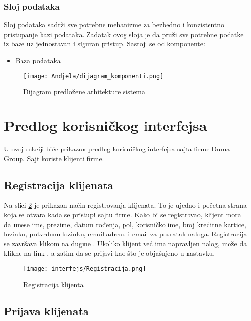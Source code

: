 \documentclass[a4paper]{article}
\begin{document}
\subsubsection{Sloj podataka}
Sloj podataka sadrži sve potrebne mehanizme za bezbedno i konzistentno pristupanje bazi podataka. Zadatak ovog sloja je da pruži sve potrebne podatke iz baze uz jednostavan i siguran  pristup.\newline
Sastoji se od komponente:
\begin{itemize}
    \item Baza podataka
\end{itemize}

\begin{figure}[H]
    \centering
    \texttt{[image: Andjela/dijagram\_komponenti.png]}
    \caption{Dijagram predložene arhitekture sistema}
    \label{fig:dijagramTabela}
\end{figure}

\section{Predlog korisničkog interfejsa}

U ovoj sekciji biće prikazan predlog korisničkog interfejsa sajta firme Duma Group. Sajt koriste klijenti firme.

\subsection{Registracija klijenata}

Na slici \ref{fig:ki_reg} je prikazan način registrovanja klijenata. To je ujedno i početna strana koja se otvara kada se pristupi sajtu firme. Kako bi se registrovao, klijent mora da unese ime, prezime, datum rođenja, pol, korisničko ime, broj kreditne kartice, lozinku, potvrđenu lozinku, email adresu i email za povratak naloga. Registracija se završava klikom na dugme . Ukoliko klijent već ima napravljen nalog, može da klikne na link , a zatim da se prijavi kao što je objašnjeno u nastavku.

\begin{figure}[H]
    \centering
    \texttt{[image: interfejs/Registracija.png]}
    \caption{Registracija klijenta}
    \label{fig:ki_reg}
\end{figure}

\subsection{Prijava klijenata}
\end{document}

